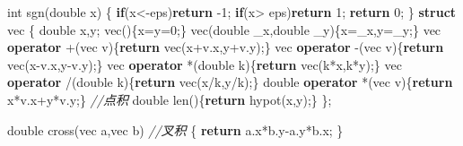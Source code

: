 \documentclass[
]{article}
\newenvironment{Shaded}{}{}
\newcommand{\CommentTok}[1]{\textcolor[rgb]{0.38,0.63,0.69}{\textit{#1}}}
\newcommand{\ControlFlowTok}[1]{\textcolor[rgb]{0.00,0.44,0.13}{\textbf{#1}}}
\newcommand{\DataTypeTok}[1]{\textcolor[rgb]{0.56,0.13,0.00}{#1}}
\newcommand{\DecValTok}[1]{\textcolor[rgb]{0.25,0.63,0.44}{#1}}
\newcommand{\KeywordTok}[1]{\textcolor[rgb]{0.00,0.44,0.13}{\textbf{#1}}}
\newcommand{\NormalTok}[1]{#1}
\begin{document}
\begin{Shaded}
\begin{Highlighting}[]
\DataTypeTok{int}\NormalTok{ sgn(}\DataTypeTok{double}\NormalTok{ x)}
\NormalTok{\{}
    \ControlFlowTok{if}\NormalTok{(x\textless{}{-}eps)}\ControlFlowTok{return}\NormalTok{ {-}}\DecValTok{1}\NormalTok{;}
    \ControlFlowTok{if}\NormalTok{(x\textgreater{} eps)}\ControlFlowTok{return}  \DecValTok{1}\NormalTok{;}
    \ControlFlowTok{return} \DecValTok{0}\NormalTok{;}
\NormalTok{\}}
\KeywordTok{struct}\NormalTok{ vec}
\NormalTok{\{}
    \DataTypeTok{double}\NormalTok{ x,y;}
\NormalTok{    vec()\{x=y=}\DecValTok{0}\NormalTok{;\}}
\NormalTok{    vec(}\DataTypeTok{double}\NormalTok{ \_x,}\DataTypeTok{double}\NormalTok{ \_y)\{x=\_x,y=\_y;\}}
\NormalTok{    vec }\KeywordTok{operator}\NormalTok{ +(vec v)\{}\ControlFlowTok{return}\NormalTok{ vec(x+v.x,y+v.y);\}}
\NormalTok{    vec }\KeywordTok{operator}\NormalTok{ {-}(vec v)\{}\ControlFlowTok{return}\NormalTok{ vec(x{-}v.x,y{-}v.y);\}}
\NormalTok{    vec }\KeywordTok{operator}\NormalTok{ *(}\DataTypeTok{double}\NormalTok{ k)\{}\ControlFlowTok{return}\NormalTok{ vec(k*x,k*y);\}}
\NormalTok{    vec }\KeywordTok{operator}\NormalTok{ /(}\DataTypeTok{double}\NormalTok{ k)\{}\ControlFlowTok{return}\NormalTok{ vec(x/k,y/k);\}}
    \DataTypeTok{double} \KeywordTok{operator}\NormalTok{ *(vec v)\{}\ControlFlowTok{return}\NormalTok{ x*v.x+y*v.y;\} }\CommentTok{//点积}
    \DataTypeTok{double}\NormalTok{ len()\{}\ControlFlowTok{return}\NormalTok{ hypot(x,y);\}}
\NormalTok{\};}

\DataTypeTok{double}\NormalTok{ cross(vec a,vec b) }\CommentTok{//叉积}
\NormalTok{\{}
    \ControlFlowTok{return}\NormalTok{ a.x*b.y{-}a.y*b.x;}
\NormalTok{\}}


\end{Highlighting}
\end{Shaded}
\end{document}

